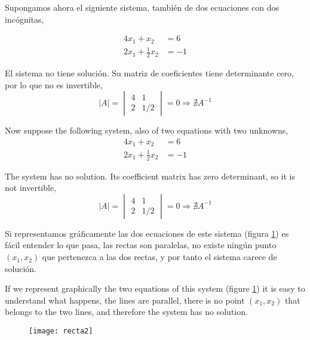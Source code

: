 \begin{paracol}{2}
    
Supongamos ahora el siguiente sistema, también de dos ecuaciones con dos incógnitas,

\begin{align*}
4x_1+x_2&=6\\
2x_1+\frac{1}{2} x_2&=-1
\end{align*}

El sistema no tiene solución. Su matriz de coeficientes tiene determinante cero, por lo que no es invertible,
\begin{equation*}
\vert A \vert =\begin{vmatrix}
4& 1\\
2& 1/2
\end{vmatrix} =0 \Rightarrow \nexists A^{-1}
\end{equation*}

\switchcolumn
Now suppose the following system, also of two equations with two unknowns,
\begin{align*}
4x_1+x_2&=6\\
2x_1+\frac{1}{2} x_2&=-1
\end{align*}

The system has no solution. Its coefficient matrix has zero determinant, so it is not invertible,
\begin{equation*}
\vert A \vert =\begin{vmatrix}
4& 1\\
2& 1/2
\end{vmatrix} =0 \Rightarrow \nexists A^{-1}
\end{equation*}

\switchcolumn
Si representamos gráficamente las dos ecuaciones de este sistema (figura \ref{fig:recta2}) es fácil entender lo que pasa, las rectas son paralelas, no existe ningún punto $(x_1,x_2)$ que pertenezca a las dos rectas, y por tanto el sistema carece de solución.

\switchcolumn
If we represent graphically the two equations of this system (figure \ref{fig:recta2}) it is easy to understand what happens, the lines are parallel, there is no point $(x_1,x_2)$ that belongs to the two lines, and therefore the system has no solution.

\end{paracol}



\begin{figure}[h]
\centering
\texttt{[image: recta2]}
\label{fig:recta2}
\end{figure}

